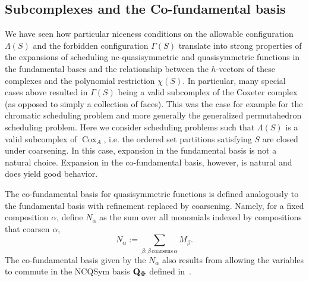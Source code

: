 \documentclass[12pt,reqno]{amsart}
\numberwithin{definition}{section}
\newtheorem{proposition}[definition]{Proposition}
\theoremstyle{definition}
\newcommand{\cox}{\operatorname{Cox}}
\newcommand{\floor}[1]{\lfloor {#1} \rfloor}
\newcommand{\ceil}[1]{\lceil {#1} \rceil}
\newcommand{\allow}{\Lambda} %
\newcommand{\poly}{\chi} %
\newcommand{\forb}{\Gamma} %
\newcommand{\comment}[1]{\textsf{\footnotesize #1}}
\begin{document}




\subsection{Subcomplexes and the Co-fundamental basis}
\label{sec:cofundamental}


We have seen how particular niceness conditions on the allowable
configuration $\allow(S)$ and the forbidden configuration $\forb(S)$
translate into strong properties of the expansions of scheduling nc-quasisymmetric and quasisymmetric functions  in the fundamental bases and the relationship between the
$h$-vectors of these complexes and the polynomial restriction
$\poly(S)$. 
 In particular, many special cases above resulted in
$\forb(S)$ being a valid subcomplex of the Coxeter complex (as
opposed to simply a collection of faces). This was the case for example for the chromatic scheduling problem and more generally the generalized permutahedron scheduling problem. 
 Here we consider scheduling problems such that $\allow(S)$ is a valid
 subcomplex of $\cox_A$, i.e. the ordered set partitions satisfying
 $S$ are closed under coarsening.  In this case, expansion in the
 fundamental basis is not a natural choice.  Expansion in the
 co-fundamental basis, however, is natural and does yield good
 behavior. 

 The co-fundamental basis for quasisymmetric functions is
 defined analogously to the fundamental basis with refinement replaced by coarsening.  Namely, for a fixed composition $\alpha$, define $N_{\alpha}$ as the sum over all monomials indexed by compositions that coarsen $\alpha$,
$$N_{\alpha} := \sum_{\beta : \beta \, \textrm{coarsens} \, \alpha} M_{\beta}.$$
The co-fundamental basis given by the $N_{\alpha}$ also results from allowing the variables to commute in the NCQSym basis ${\bf {Q}_{\Phi}}$ defined in~\cite{Zab}.
\end{document}
